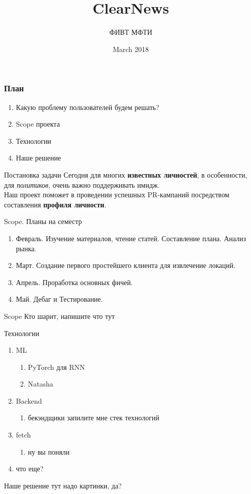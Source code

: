 \documentclass[10pt,pdf,hyperref={unicode}]{beamer}
\title{ClearNews}
\author{ФИВТ МФТИ}
\date{March 2018}
\begin{document}
\maketitle
\begin{frame}\frametitle{План}
\begin{enumerate}
    \item Какую проблему пользователей будем решать?
    \item Scope проекта
    \item Технологии
    \item Наше решение
\end{enumerate}
\end{frame}
\begin{frame}{Постановка задачи}
Сегодня для многих \textbf{известных личностей}, в особенности, для \textit{политиков}, очень важно поддерживать имидж. \\Наш проект поможет в проведении успешных PR-кампаний посредством составления \textbf{профиля личности}.
\end{frame}
\begin{frame}{Scope. Планы на семестр}
    \begin{enumerate}
        \item Февраль. Изучение материалов, чтение статей. Составление плана. Анализ рынка.
        \item Март. Создание первого простейшего клиента для извлечение локаций.
        \item Апрель. Проработка основных фичей. 
        \item Май. Дебаг и Тестирование.
    \end{enumerate}
\end{frame}
\begin{frame}{Scope}
Кто шарит, напишите что тут
\end{frame}
\begin{frame}{Технологии}
\begin{enumerate}
    \item ML
    \begin{enumerate}
        \item PyTorch для RNN
        \item Natasha
    \end{enumerate}
    \item Backend
        \begin{enumerate}
            \item бекэндщики запилите мне стек технологий
        \end{enumerate}
    \item fetch
        \begin{enumerate}
            \item ну вы поняли
        \end{enumerate}
    \item что еще?
\end{enumerate}
\end{frame}
\begin{frame}{Наше решение}
тут надо картинки, да?
    
\end{frame}
\end{document}
